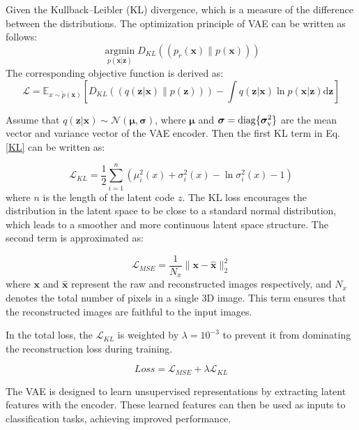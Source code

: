 \documentclass[journal,twoside,web]{ieeecolor}
\begin{document}
Given the Kullback–Leibler (KL) divergence, which is a measure of the difference between the distributions. The optimization principle of VAE can be written as follows:
\begin{equation}
	\mathop{\arg\min}\limits_{{p(\bm x|\bm z)} }  D_{KL}(\left(p_{r}(\bm x)\|p(\bm x)\right))
\end{equation}
The corresponding objective function is derived as:
\begin{equation}
	\mathcal{L} = \mathbb{E}_{x\sim\tilde{p}(\bm x)}[D_{KL}(\left(q(\bm z|\bm x)\|p(\bm z)\right)) - \int q(\bm z|\bm x) \ln p(\bm x|\bm z) \mathrm{d}\bm z] 
	\label{KL}
\end{equation}

Assume that $q(\bm z|\bm x)\sim \mathcal{N}(\bm \mu, \bm \sigma)$, where $\bm \mu$ and $\bm \sigma = \rm diag \{ \bm \sigma_{v}^2 \} $
are the mean vector and variance vector of the VAE encoder. Then the first KL term in Eq.\ref{KL} can be written as:

\begin{equation}
	\mathcal{L}_{KL} = \frac{1}{2}\sum_{i=1}^{n}(\mu_{i}^{2}(x)+\sigma_{i}^{2}(x)-\ln\sigma_{i}^{2}(x)-1)
\end{equation}
where $n$ is the length of the latent code $z$. The KL loss encourages the distribution in the latent space to be close to a standard normal distribution, which leads to a smoother and more continuous latent space structure. The second term is approximated \cite{zhang2022deep, lin2022feature} as:

\begin{equation}
	\mathcal{L}_{MSE} = \frac{1}{N_{x}}\|\bm x - \hat{\bm x}\|_2^{2}
\end{equation}
where $\bm x$ and $\hat{\bm x}$ represent the raw and reconstructed images respectively, and $N_{x}$ denotes the total number of pixels in a single 3D image. This term ensures that the reconstructed images are faithful to the input images.

In the total loss, the $\mathcal{L}_{KL}$ is weighted by  $\lambda = 10^{-3}$ to prevent it from dominating the reconstruction loss during training. 

\begin{equation}
	Loss = 	\mathcal{L}_{MSE}+\lambda \mathcal{L}_{KL}
\end{equation}

The VAE is designed to learn unsupervised representations by extracting latent features with the encoder. These learned features can then be used as inputs to classification tasks, achieving improved performance.
 
\end{document}
